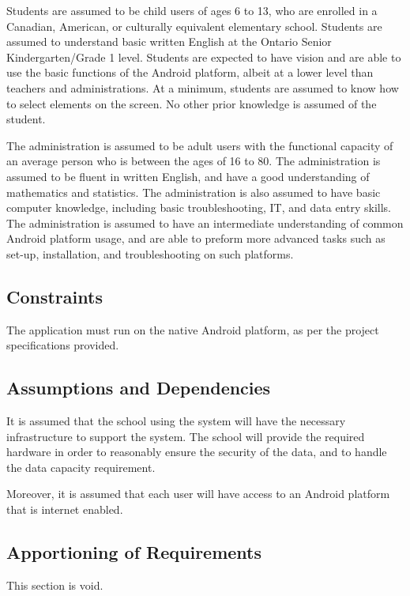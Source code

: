 \documentclass[]{article}
\begin{document}
Students are assumed to be child users of ages 6 to 13, who are enrolled in a
Canadian, American, or culturally equivalent elementary school. Students are
assumed to understand basic written English at the Ontario Senior
Kindergarten/Grade 1 level. Students are expected to have vision and are able
to use the basic functions of the Android platform, albeit at a lower level
than teachers and administrations. At a minimum, students are assumed to know
how to select elements on the screen. No other prior knowledge is assumed of
the student.

The administration is assumed to be adult users with the functional capacity of
an average person who is between the ages of 16 to 80. The administration is
assumed to be fluent in written English, and have a good understanding of
mathematics and statistics. The administration is also assumed to have basic
computer knowledge, including basic troubleshooting, IT, and data entry skills.
The administration is assumed to have an intermediate understanding of common
Android platform usage, and are able to preform more advanced tasks such as
set-up, installation, and troubleshooting on such platforms.

\subsection{Constraints}
\label{sub:constraints}
The application must run on the native Android platform, as per the project
specifications provided.

\subsection{Assumptions and Dependencies}
\label{sub:assumptions_and_dependencies}
It is assumed that the school using the system will have the necessary
infrastructure to support the system. The school will provide the required
hardware in order to reasonably ensure the security of the data, and to handle
the data capacity requirement.

Moreover, it is assumed that each user will have access to an Android platform
that is internet enabled.

\subsection{Apportioning of Requirements}
\label{sub:apportioning_of_requirements}
This section is void.
\end{document}
